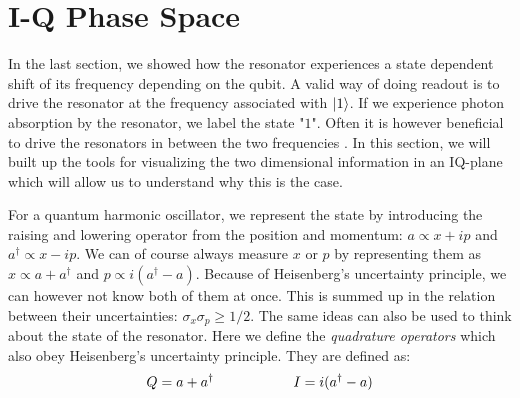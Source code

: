 \section{I-Q Phase Space}\label{sec:IQ_phase_space}
In the last section, we showed how the resonator experiences a state dependent shift of its frequency depending on the qubit. A valid way of doing readout is to drive the resonator at the frequency associated with $\ket{1}$. If we experience photon absorption by the resonator, we label the state "$1$". Often it is however beneficial to drive the resonators in between the two frequencies \cite{blais_cavity_2004}. In this section, we will built up the tools for visualizing the two dimensional information in an IQ-plane which will allow us to understand why this is the case.

For a quantum harmonic oscillator, we represent the state by introducing the raising and lowering operator from the position and momentum: $a \propto x + ip$ and $a^\dagger \propto x - ip$. We can of course always measure $x$ or $p$ by representing them as $x \propto a + a^\dagger$ and $p\propto i (a^\dagger - a)$. Because of Heisenberg's uncertainty principle, we can however not know both of them at once. This is summed up in the relation between their uncertainties: $\sigma_x \sigma_p \geq 1/2$.  The same ideas can also be used to think about the state of the resonator. Here we define the \textit{quadrature operators} which also obey Heisenberg's uncertainty principle. They are defined  as\cite{gerry_introductory_2004}: 
\begin{equation}
    Q = a + a^\dagger \hspace{2 cm} I = i(a^\dagger - a)
\end{equation}



